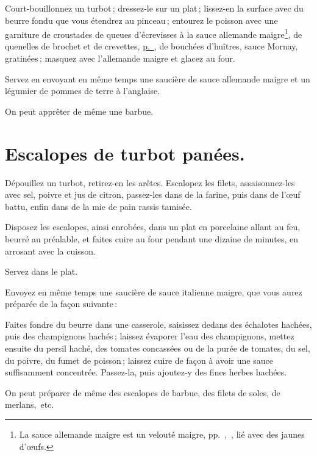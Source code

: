 Court-bouillonnez un turbot ; dressez-le sur un plat ; lissez-en la surface
avec du beurre fondu que vous étendrez au pinceau ; entourez le poisson avec
une garniture de croustades de queues d'écrevisses à la sauce allemande
maigre\footnote{La sauce allemande maigre est un velouté maigre,
pp. \hyperlink{p0292}{\pageref{pg0292}}, \hyperlink{p0338}{\pageref{pg0338}}, lié
avec des jaunes d'œufs.}, de quenelles de brochet et de crevettes,
\hyperlink{p0328}{p. \pageref{pg0328}}, de bouchées d'huîtres, sauce Mornay,
gratinées ; masquez avec l'allemande maigre et glacez au four.

Servez en envoyant en même temps une saucière de sauce allemande maigre et un
légumier de pommes de terre à l'anglaise.

\sk

On peut apprêter de même une barbue.

\section*{\centering Escalopes de turbot panées.}

Dépouillez un turbot, retirez-en les arêtes. Escalopez les filets, assaisonnez-les
avec sel, poivre et jus de citron, passez-les dans de la farine, puis dans de l'œuf
battu, enfin dans de la mie de pain rassis tamisée.

Disposez les escalopes, ainsi enrobées, dans un plat en porcelaine allant au feu,
beurré au préalable, et faites cuire au four pendant une dizaine de minutes, en
arrosant avec la cuisson.

Servez dans le plat.

Envoyez en même temps une saucière de sauce italienne maigre, que vous
aurez préparée de la façon suivante :

Faites fondre du beurre dans une casserole, saisissez dedans des échalotes
hachées, puis des champignons hachés ; laissez évaporer l'eau des champignons,
mettez ensuite du persil haché, des tomates concassées ou de la purée de
tomates, du sel, du poivre, du fumet de poisson ; laissez cuire de façon
à avoir une sauce suffisamment concentrée. Passez-la, puis ajoutez-y des fines
herbes hachées.

\sk

On peut préparer de même des escalopes de barbue, des filets de soles, de
merlans, etc.

